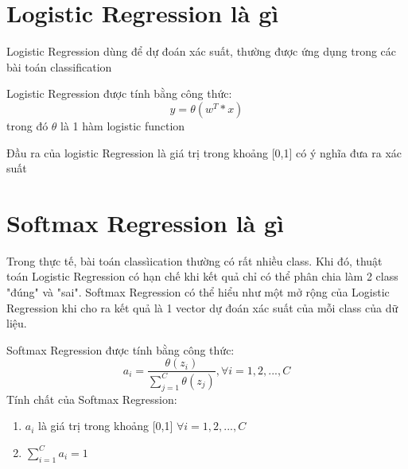 \documentclass[12pt,letterpaper]{article}
\begin{document}
\section*{Logistic Regression là gì}
Logistic Regression dùng để dự đoán xác suất, thường được ứng dụng trong các bài toán classification

Logistic Regression được tính bằng công thức:
$$
    y = \theta(w^T*x)
$$
trong đó $\theta$ là 1 hàm logistic function

Đầu ra của logistic Regression là giá trị trong khoảng [0,1] có ý nghĩa đưa ra xác suất

\section*{Softmax Regression là gì}
Trong thực tế, bài toán classìication thường có rất nhiều class. Khi đó, thuật toán Logistic Regression có hạn chế khi kết quả chỉ có thể phân chia làm 2 class "đúng" và "sai". Softmax Regression có thể hiểu như một mở rộng của Logistic Regression khi cho ra kết quả là 1 vector dự đoán xác suất của mỗi class của dữ liệu.

Softmax Regression được tính bằng công thức:
$$
    a_i = \frac{\theta(z_i)}{\sum_{j = 1}^{C}{\theta(z_j)}} , \forall i = 1,2,...,C 
$$
Tính chất của Softmax Regression:
\begin{enumerate}
    \item $ a_i $ là giá trị trong khoảng [0,1] $\forall i = 1,2,...,C $
    \item $\sum_{i=1}^C{a_i} = 1$
\end{enumerate}
\end{document}
